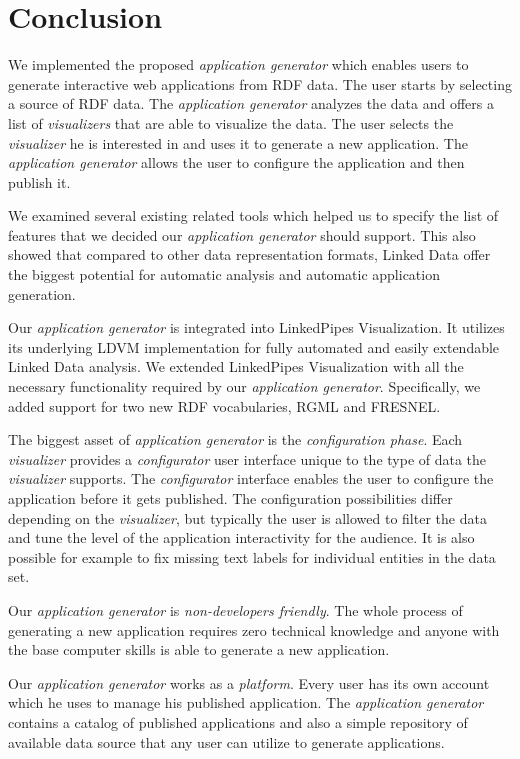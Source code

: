 \chapter*{Conclusion}

We implemented the proposed \emph{application generator} which enables users to generate interactive web applications from RDF data. The user starts by selecting a source of RDF data. The \emph{application generator} analyzes the data and offers a list of \emph{visualizers} that are able to visualize the data. The user selects the \emph{visualizer} he is interested in and uses it to generate a new application. The \emph{application generator} allows the user to configure the application and then publish it.

We examined several existing related tools which helped us to specify the list of features that we decided our \emph{application generator} should support. This also showed that compared to other data representation formats, Linked Data offer the biggest potential for automatic analysis and automatic application generation.

Our \emph{application generator} is integrated into LinkedPipes Visualization. It utilizes its underlying LDVM implementation for fully automated and easily extendable Linked Data analysis. We extended LinkedPipes Visualization with all the necessary functionality required by our \emph{application generator}. Specifically, we added support for two new RDF vocabularies, RGML and FRESNEL.

The biggest asset of \emph{application generator} is the \emph{configuration phase}. Each \emph{visualizer} provides a \emph{configurator} user interface unique to the type of data the \emph{visualizer} supports. The \emph{configurator} interface enables the user to configure the application before it gets published. The configuration possibilities differ depending on the \emph{visualizer}, but typically the user is allowed to filter the data and tune the level of the application interactivity for the audience. It is also possible for example to fix missing text labels for individual entities in the data set.

Our \emph{application generator} is \emph{non-developers friendly}. The whole process of generating a new application requires zero technical knowledge and anyone with the base computer skills is able to generate a new application.

Our \emph{application generator} works as a \emph{platform}. Every user has its own account which he uses to manage his published application. The \emph{application generator} contains a catalog of published applications and also a simple repository of available data source that any user can utilize to generate applications.


